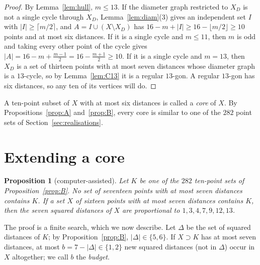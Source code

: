 \documentclass[11pt]{amsart}
\newtheorem{proposition}[theorem]{Proposition}
\theoremstyle{definition}
\theoremstyle{remark}
\begin{document}
\begin{proof}
By Lemma~\ref{lem:hull}, $m\le13$. If the diameter graph restricted to $X_D$ is not a single cycle through
$X_D$, Lemma~\ref{lem:diam}(3) gives an independent set $I$ with $|I|\ge\lceil m/2\rceil$, and
$A=I\cup(X\setminus X_D)$ has $16-m+|I|\ge16-\lfloor m/2\rfloor\ge10$ points and at most six distances. If it
is a single cycle and $m\le11$, then $m$ is odd and taking every other point of the cycle gives
$|A|=16-m+\frac{m-1}2=16-\frac{m+1}2\ge10$. If it is a single cycle and $m=13$, then $X_D$ is a set of thirteen
points with at most seven distances whose diameter graph is a $13$-cycle, so by Lemma~\ref{lem:C13} it is a
regular $13$-gon. A regular $13$-gon has six distances, so any ten of its vertices will do.
\end{proof}

A ten-point subset of $X$ with at most six distances is called a \emph{core} of $X$. By
Propositions~\ref{prop:A} and~\ref{prop:B}, every core is similar to one of the $282$ point sets of
Section~\ref{sec:realisations}.

\section{Extending a core}\label{sec:extensions}

\begin{proposition}[computer-assisted]\label{prop:extend}
Let $K$ be one of the $282$ ten-point sets of Proposition~\ref{prop:B}. No set of seventeen points with at
most seven distances contains $K$. If a set $X$ of sixteen points with at most seven distances contains $K$,
then the seven squared distances of $X$ are proportional to $1,3,4,7,9,12,13$.
\end{proposition}

The proof is a finite search, which we now describe. Let $\Delta$ be the set of squared distances of $K$; by
Proposition~\ref{prop:B}, $|\Delta|\in\{5,6\}$. If $X\supset K$ has at most seven distances, at most
$b=7-|\Delta|\in\{1,2\}$ new squared distances (not in $\Delta$) occur in $X$ altogether; we call $b$ the
\emph{budget}.
\end{document}
